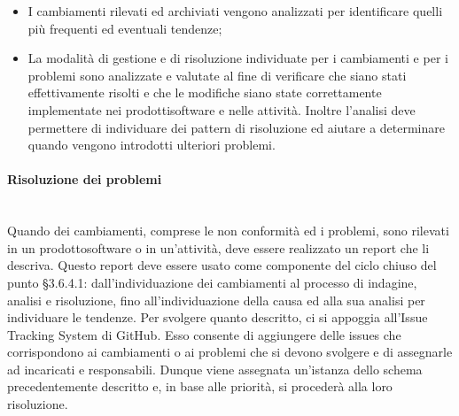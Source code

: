 \begin{itemize}
\begin{itemize}
\begin{itemize}
			\item \textbf{Conformità}: cambiamento che comporta violazioni di conformità del prodotto\glosp;
			\item \textbf{Validazione}: cambiamento riscontrato durante il processo\glosp di Validazione\glosp del prodotto\glosp.
		\end{itemize}
		\item \textbf{Priorità}: può essere:
		\begin{itemize}
			\item bloccante;
			\item urgente;
			\item alta;
			\item media;
			\item bassa.
		\end{itemize}
		\item \textbf{Stato}: può essere:
		\begin{itemize}
			\item da fare;
			\item in corso;
			\item completato.
		\end{itemize}
	\end{itemize}
	\item I cambiamenti rilevati ed archiviati vengono analizzati per identificare quelli più frequenti ed eventuali tendenze;
	\item La modalità di gestione e di risoluzione individuate per i cambiamenti e per i problemi sono analizzate e valutate al fine di verificare che siano stati effettivamente risolti e che le modifiche siano state correttamente implementate nei prodotti\glosp software e nelle attività. Inoltre l'analisi deve permettere di individuare dei pattern di risoluzione ed aiutare a determinare quando vengono introdotti ulteriori problemi.			
\end{itemize}

\paragraph{Risoluzione dei problemi}\mbox{}\\ [1mm]
Quando dei cambiamenti, comprese le non conformità ed i problemi, sono rilevati in un prodotto\glosp software o in un'attività, deve essere realizzato un report che li descriva. Questo report deve essere usato come componente del ciclo chiuso del punto §3.6.4.1: dall'individuazione dei cambiamenti al processo di indagine, analisi e risoluzione, fino all'individuazione della causa ed alla sua analisi per individuare le tendenze.
Per svolgere quanto descritto, ci si appoggia all'Issue Tracking System di GitHub. Esso consente di aggiungere delle issues che corrispondono ai cambiamenti o ai problemi che si devono svolgere e di assegnarle ad incaricati e responsabili. Dunque viene assegnata un'istanza dello schema precedentemente descritto e, in base alle priorità, si procederà alla loro risoluzione.

